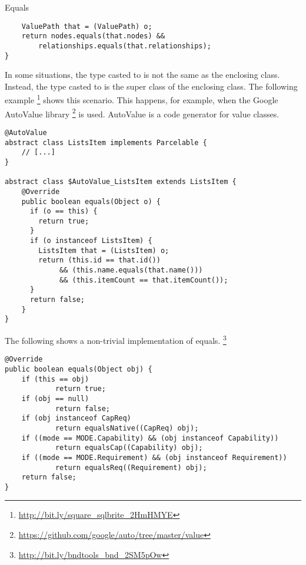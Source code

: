 \begin{pattern}{Equals}
\begin{verbatim}
    ValuePath that = (ValuePath) o;
    return nodes.equals(that.nodes) &&
        relationships.equals(that.relationships);
}
\end{verbatim}

In some situations,
the type casted to is not the same as the enclosing class.
Instead, the type casted to is the super class of the enclosing class.
The following example%
\footnote{\url{http://bit.ly/square_sqlbrite_2HmHMYE}}
shows this scenario.
This happens, for example, when the Google AutoValue library%
\footnote{\url{https://github.com/google/auto/tree/master/value}}
is used.
AutoValue is a code generator for value classes.

\begin{verbatim}
@AutoValue
abstract class ListsItem implements Parcelable {
    // [...]
}

abstract class $AutoValue_ListsItem extends ListsItem {
    @Override
    public boolean equals(Object o) {
      if (o == this) {
        return true;
      }
      if (o instanceof ListsItem) {
        ListsItem that = (ListsItem) o;
        return (this.id == that.id())
             && (this.name.equals(that.name()))
             && (this.itemCount == that.itemCount());
      }
      return false;
    }
}
\end{verbatim}

The following shows a non-trivial implementation of equals.
\footnote{\url{http://bit.ly/bndtools_bnd_2SM5pOw}}

\begin{verbatim}
@Override
public boolean equals(Object obj) {
    if (this == obj)
            return true;
    if (obj == null)
            return false;
    if (obj instanceof CapReq)
            return equalsNative((CapReq) obj);
    if ((mode == MODE.Capability) && (obj instanceof Capability))
            return equalsCap((Capability) obj);
    if ((mode == MODE.Requirement) && (obj instanceof Requirement))
            return equalsReq((Requirement) obj);
    return false;
}
\end{verbatim}


\end{pattern}
